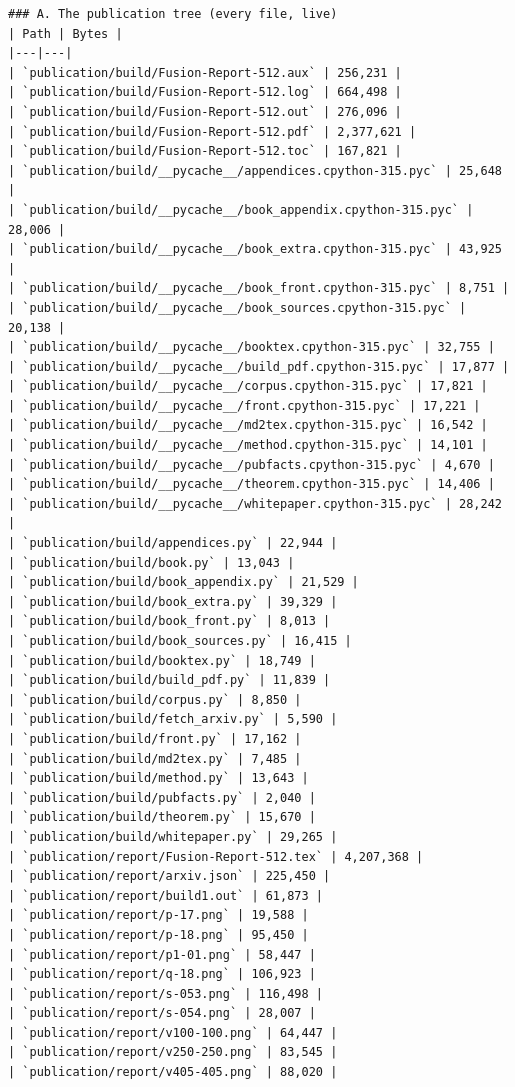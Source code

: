 \begin{Verbatim}[breaklines,breakanywhere,fontsize=\footnotesize]
### A. The publication tree (every file, live)
| Path | Bytes |
|---|---|
| `publication/build/Fusion-Report-512.aux` | 256,231 |
| `publication/build/Fusion-Report-512.log` | 664,498 |
| `publication/build/Fusion-Report-512.out` | 276,096 |
| `publication/build/Fusion-Report-512.pdf` | 2,377,621 |
| `publication/build/Fusion-Report-512.toc` | 167,821 |
| `publication/build/__pycache__/appendices.cpython-315.pyc` | 25,648 |
| `publication/build/__pycache__/book_appendix.cpython-315.pyc` | 28,006 |
| `publication/build/__pycache__/book_extra.cpython-315.pyc` | 43,925 |
| `publication/build/__pycache__/book_front.cpython-315.pyc` | 8,751 |
| `publication/build/__pycache__/book_sources.cpython-315.pyc` | 20,138 |
| `publication/build/__pycache__/booktex.cpython-315.pyc` | 32,755 |
| `publication/build/__pycache__/build_pdf.cpython-315.pyc` | 17,877 |
| `publication/build/__pycache__/corpus.cpython-315.pyc` | 17,821 |
| `publication/build/__pycache__/front.cpython-315.pyc` | 17,221 |
| `publication/build/__pycache__/md2tex.cpython-315.pyc` | 16,542 |
| `publication/build/__pycache__/method.cpython-315.pyc` | 14,101 |
| `publication/build/__pycache__/pubfacts.cpython-315.pyc` | 4,670 |
| `publication/build/__pycache__/theorem.cpython-315.pyc` | 14,406 |
| `publication/build/__pycache__/whitepaper.cpython-315.pyc` | 28,242 |
| `publication/build/appendices.py` | 22,944 |
| `publication/build/book.py` | 13,043 |
| `publication/build/book_appendix.py` | 21,529 |
| `publication/build/book_extra.py` | 39,329 |
| `publication/build/book_front.py` | 8,013 |
| `publication/build/book_sources.py` | 16,415 |
| `publication/build/booktex.py` | 18,749 |
| `publication/build/build_pdf.py` | 11,839 |
| `publication/build/corpus.py` | 8,850 |
| `publication/build/fetch_arxiv.py` | 5,590 |
| `publication/build/front.py` | 17,162 |
| `publication/build/md2tex.py` | 7,485 |
| `publication/build/method.py` | 13,643 |
| `publication/build/pubfacts.py` | 2,040 |
| `publication/build/theorem.py` | 15,670 |
| `publication/build/whitepaper.py` | 29,265 |
| `publication/report/Fusion-Report-512.tex` | 4,207,368 |
| `publication/report/arxiv.json` | 225,450 |
| `publication/report/build1.out` | 61,873 |
| `publication/report/p-17.png` | 19,588 |
| `publication/report/p-18.png` | 95,450 |
| `publication/report/p1-01.png` | 58,447 |
| `publication/report/q-18.png` | 106,923 |
| `publication/report/s-053.png` | 116,498 |
| `publication/report/s-054.png` | 28,007 |
| `publication/report/v100-100.png` | 64,447 |
| `publication/report/v250-250.png` | 83,545 |
| `publication/report/v405-405.png` | 88,020 |

\end{Verbatim}
